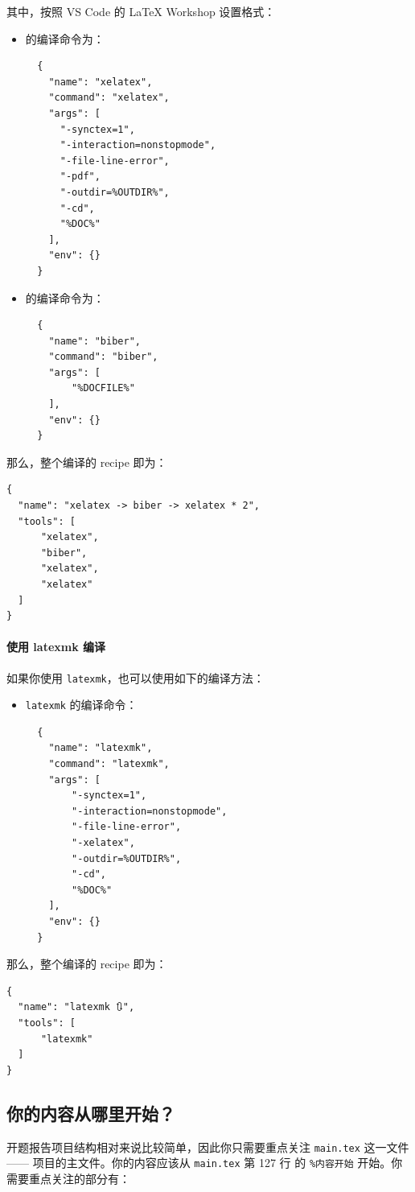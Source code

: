 其中，按照 VS Code 的 LaTeX Workshop 设置格式：

\begin{itemize}
  \item {} 的编译命令为：
  \begin{verbatim}
  {
    "name": "xelatex",
    "command": "xelatex",
    "args": [
      "-synctex=1",
      "-interaction=nonstopmode",
      "-file-line-error",
      "-pdf",
      "-outdir=%OUTDIR%",
      "-cd",
      "%DOC%"
    ],
    "env": {}
  }
  \end{verbatim}
  \item {} 的编译命令为：
  \begin{verbatim}
  {
    "name": "biber",
    "command": "biber",
    "args": [
        "%DOCFILE%"
    ],
    "env": {}
  }
  \end{verbatim}
\end{itemize}

那么，整个编译的 recipe 即为：

\begin{verbatim}
{
  "name": "xelatex -> biber -> xelatex * 2",
  "tools": [
      "xelatex",
      "biber",
      "xelatex",
      "xelatex"
  ]
}
\end{verbatim}

\paragraph{使用 latexmk 编译}
如果你使用 \texttt{latexmk}，也可以使用如下的编译方法：

\begin{itemize}
  \item \texttt{latexmk} 的编译命令：
  \begin{verbatim}
  {
    "name": "latexmk",
    "command": "latexmk",
    "args": [
        "-synctex=1",
        "-interaction=nonstopmode",
        "-file-line-error",
        "-xelatex",
        "-outdir=%OUTDIR%",
        "-cd",
        "%DOC%"
    ],
    "env": {}
  }
  \end{verbatim}
\end{itemize}

那么，整个编译的 recipe 即为：
\begin{verbatim}
{
  "name": "latexmk 🔃",
  "tools": [
      "latexmk"
  ]
}
\end{verbatim}

\subsection{你的内容从哪里开始？}
开题报告项目结构相对来说比较简单，因此你只需要重点关注 \texttt{main.tex} 这一文件 —— 项目的主文件。你的内容应该从 \texttt{main.tex} 第 127 行 的 \texttt{\%内容开始} 开始。你需要重点关注的部分有：

